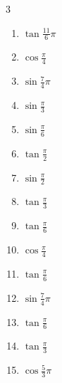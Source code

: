 \begin{multicols}{3}
\begin{enumerate}
  \item $\displaystyle \tan{\frac{11}{6}\pi}$

  \item $\displaystyle \cos{\frac{\pi}{4}}$

  \item $\displaystyle \sin{\frac{7}{4}\pi}$

  \item $\displaystyle \sin{\frac{\pi}{3}}$

  \item $\displaystyle \sin{\frac{\pi}{6}}$

  \item $\displaystyle \tan{\frac{\pi}{2}}$
        \phantom{$\displaystyle \quad なし$}

  \item $\displaystyle \sin{\frac{\pi}{2}}$
        \phantom{$\displaystyle =1$}

  \item $\displaystyle \tan{\frac{\pi}{3}}$

  \item $\displaystyle \tan{\frac{\pi}{6}}$

  \item $\displaystyle \cos{\frac{\pi}{4}}$

  \item $\displaystyle \tan{\frac{\pi}{6}}$

  \item $\displaystyle \sin{\frac{7}{4}\pi}$

  \item $\displaystyle \tan{\frac{\pi}{6}}$

  \item $\displaystyle \tan{\frac{\pi}{3}}$

  \item $\displaystyle \cos{\frac{5}{3}\pi}$


\end{enumerate}
\end{multicols}
